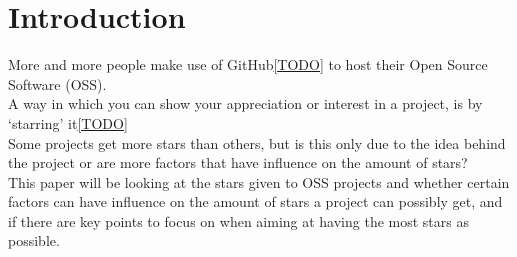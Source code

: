 \section{Introduction}
More and more people make use of GitHub\ref{TODO} to host their Open Source Software (OSS). \\
A way in which you can show your appreciation or interest in a project, is by `starring' it\ref{TODO} \\
Some projects get more stars than others, but is this only due to the idea behind the project or are more factors that have influence on the amount of stars? \\
This paper will be looking at the stars given to OSS projects and whether certain factors can have influence on the amount of stars a project can possibly get, and if there are key points to focus on when aiming at having the most stars as possible. \\



